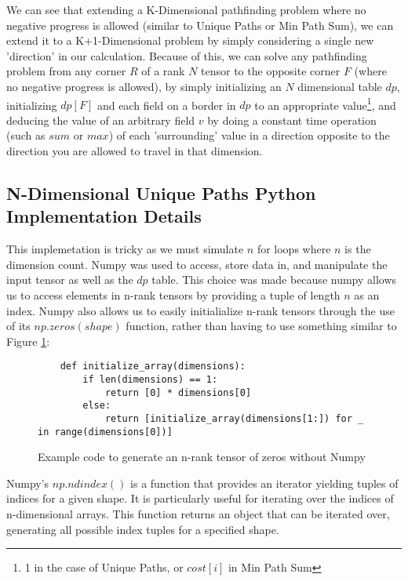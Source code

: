 
We can see that extending a K-Dimensional pathfinding problem where no negative progress is allowed (similar to Unique Paths or Min Path Sum),
we can extend it to a K+1-Dimensional problem by simply considering a single new 'direction' in our calculation.
Because of this, we can solve any pathfinding problem from any corner $R$ of a rank $N$ tensor to the opposite corner $F$ (where no negative progress is allowed),
by simply initializing an $N$ dimensional table $dp$, initializing $dp[F]$ and each field on a border in $dp$ to an appropriate value\footnote{1 in the case of Unique Paths, or $cost[i]$ in Min Path Sum}, and deducing the value of an arbitrary field $v$ by doing a constant time operation (such as $sum$ or $max$) of each 'surrounding' value in a direction opposite to the direction you are allowed to travel in that dimension.


\subsection{N-Dimensional Unique Paths Python Implementation Details}
This implemetation is tricky as we must simulate $n$ for loops where $n$ is the dimension count.
Numpy was used to access, store data in, and manipulate the input tensor as well as the $dp$ table.
This choice was made because numpy allows us to access elements in n-rank tensors by providing a tuple of length $n$ as an index.
Numpy also allows us to easily initialialize n-rank tensors through the use of its $np.zeros(shape)$ function, rather than having to use something similar to Figure \ref{fig:zeros}:

\begin{figure}[H]
    \centering
    \begin{lstlisting}
    def initialize_array(dimensions):
        if len(dimensions) == 1:
            return [0] * dimensions[0]
        else:
            return [initialize_array(dimensions[1:]) for _ in range(dimensions[0])]
    \end{lstlisting}
    \caption{Example code to generate an n-rank tensor of zeros without Numpy}
    \label{fig:zeros}
\end{figure}

Numpy's $np.ndindex()$ is a function that provides an iterator yielding tuples of indices for a given shape.
It is particularly useful for iterating over the indices of n-dimensional arrays.
This function returns an object that can be iterated over, generating all possible index tuples for a specified shape.

